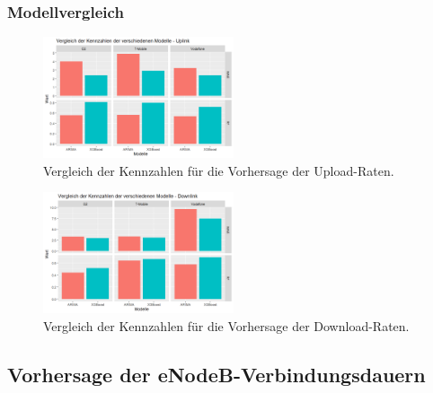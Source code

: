 \subsubsection{Modellvergleich}

\begin{figure}
    \centering
    \includegraphics[width=0.5\textwidth]{abbildungen/kennzahlen_vergleich_uplink}
    \caption{Vergleich der Kennzahlen f\"ur die Vorhersage der Upload-Raten.}
    \label{fig:kennzahlen-ul}
\end{figure}

\begin{figure}
    \centering
    \includegraphics[width=0.5\textwidth]{abbildungen/kennzahlen_vergleich_downlink}
    \caption{Vergleich der Kennzahlen f\"ur die Vorhersage der Download-Raten.}
    \label{fig:kennzahlen-dl}
\end{figure}

\subsection{Vorhersage der eNodeB-Verbindungsdauern}